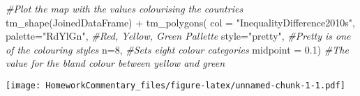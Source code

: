 \documentclass[
]{article}
\newenvironment{Shaded}{\begin{snugshade}}{\end{snugshade}}
\newcommand{\AttributeTok}[1]{\textcolor[rgb]{0.77,0.63,0.00}{#1}}
\newcommand{\CommentTok}[1]{\textcolor[rgb]{0.56,0.35,0.01}{\textit{#1}}}
\newcommand{\DecValTok}[1]{\textcolor[rgb]{0.00,0.00,0.81}{#1}}
\newcommand{\FloatTok}[1]{\textcolor[rgb]{0.00,0.00,0.81}{#1}}
\newcommand{\FunctionTok}[1]{\textcolor[rgb]{0.00,0.00,0.00}{#1}}
\newcommand{\NormalTok}[1]{#1}
\newcommand{\SpecialCharTok}[1]{\textcolor[rgb]{0.00,0.00,0.00}{#1}}
\newcommand{\StringTok}[1]{\textcolor[rgb]{0.31,0.60,0.02}{#1}}
\begin{document}
\begin{Shaded}
\begin{Highlighting}[]
\CommentTok{\#Plot the map with the values colourising the countries}
\FunctionTok{tm\_shape}\NormalTok{(JoinedDataFrame) }\SpecialCharTok{+}
  \FunctionTok{tm\_polygons}\NormalTok{(}
    \AttributeTok{col =} \StringTok{"InequalityDifference2010s"}\NormalTok{,}
    \AttributeTok{palette=}\StringTok{"RdYlGn"}\NormalTok{, }\CommentTok{\#Red, Yellow, Green Pallette}
    \AttributeTok{style=}\StringTok{"pretty"}\NormalTok{, }\CommentTok{\#Pretty is one of the colouring styles}
    \AttributeTok{n=}\DecValTok{8}\NormalTok{, }\CommentTok{\#Sets eight colour categories}
    \AttributeTok{midpoint =} \FloatTok{0.1}\NormalTok{) }\CommentTok{\#The value for the bland colour between yellow and green}
\end{Highlighting}
\end{Shaded}

\texttt{[image: HomeworkCommentary\_files/figure-latex/unnamed-chunk-1-1.pdf]}
\end{document}
